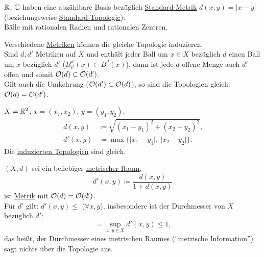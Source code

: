 \begin{example}
  $ \mathbb{R} $, $ \mathbb{C} $ haben eine abzählbare Basis bezüglich \hyperref[bsp:standardmetrik]{Standard-Metrik} $ d(x,y) = \vert x - y \vert $ (beziehungsweise \hyperref[bsp:standardtopologie]{Standard-Topologie}): \\
  Bälle mit rationalen Radien und rationalen Zentren.
\end{example}

\begin{remark}
  Verschiedene \hyperref[def:metrik]{Metriken} können die gleiche Topologie induzieren: \\
  Sind $ d, d' $ Metriken auf $ X $ und enthält jeder Ball um $ x \in X $ bezüglich $ d $ einen Ball um $ x $ bezüglich $ d' $ ($ B_{\epsilon'}^d(x) \subset B_\epsilon^d(x) $), dann ist jede $ d $-offene Menge auch $ d' $-offen und somit $ \mathcal{O}(d) \subset \mathcal{O}(d') $. \\
  Gilt auch die Umkehrung ($ \mathcal{O}(d') \subset \mathcal{O}(d) $), so sind die Topologien gleich: $ \mathcal{O}(d) = \mathcal{O}(d') $.
\end{remark}

\begin{example}
  $ X = \mathbb{R}^2 $, $ x = (x_1, x_2) $, $ y = (y_1, y_2) $.
  \begin{align*}
    d(x,y) &\coloneqq \sqrt{(x_1-y_1)^2+(x_2-y_2)^2}\text{,} \\
    d'(x,y) &\coloneqq \max\{ \vert x_1-y_1\vert, \ \vert x_2-y_2 \vert \}\text{.}
  \end{align*}
  Die \hyperref[def:induzierteTopologie]{induzierten Topologien} sind gleich.
\end{example}

\begin{example}
  $ (X, d) $ sei ein beliebiger \hyperref[def:metrischerRaum]{metrischer Raum},
  \begin{equation*}
    d'(x,y) \coloneqq \frac{d(x,y)}{1 + d(x,y)}
  \end{equation*}
  ist \hyperref[def:metrik]{Metrik} mit $ \mathcal{O}(d) = \mathcal{O}(d') $. \\
  Für $ d' $ gilt: $ d'(x,y) \leq $ ($ \forall x,y $), insbesondere ist der Durchmesser von $ X $ bezüglich $ d' $:
  \begin{equation*}
    = \sup_{x,y \in X}d'(x,y) \leq 1\text{,}
  \end{equation*}
  das heißt, der Durchmesser eines metrischen Raumes (``metrische Information'') sagt nichts über die Topologie aus.
\end{example}


